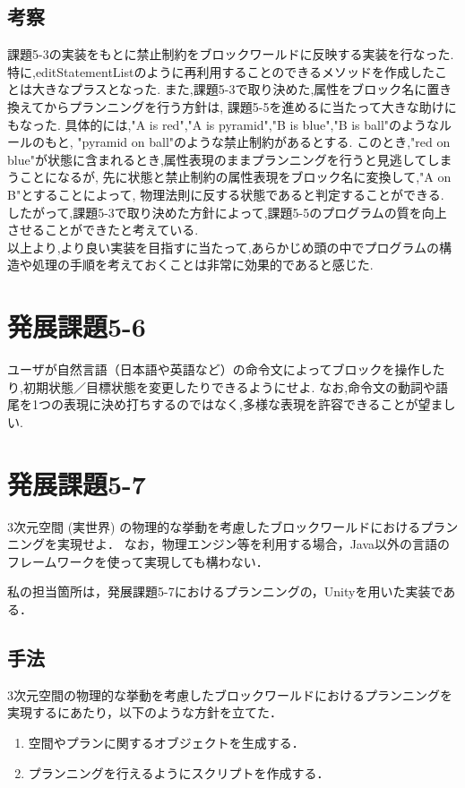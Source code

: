 \documentclass[uplatex,12pt]{jsarticle}
\begin{document}
\subsection{考察}
課題5-3の実装をもとに禁止制約をブロックワールドに反映する実装を行なった.
特に,editStatementListのように再利用することのできるメソッドを作成したことは大きなプラスとなった.
また,課題5-3で取り決めた,属性をブロック名に置き換えてからプランニングを行う方針は,
課題5-5を進めるに当たって大きな助けにもなった.
具体的には,"A is red","A is pyramid","B is blue","B is ball"のようなルールのもと,
"pyramid on ball"のような禁止制約があるとする.
このとき,"red on blue"が状態に含まれるとき,属性表現のままプランニングを行うと見逃してしまうことになるが,
先に状態と禁止制約の属性表現をブロック名に変換して,"A on B"とすることによって,
物理法則に反する状態であると判定することができる. \\
したがって,課題5-3で取り決めた方針によって,課題5-5のプログラムの質を向上させることができたと考えている. \\
以上より,より良い実装を目指すに当たって,あらかじめ頭の中でプログラムの構造や処理の手順を考えておくことは非常に効果的であると感じた.


\section{発展課題5-6}
\begin{screen}
    ユーザが自然言語（日本語や英語など）の命令文によってブロックを操作したり,初期状態／目標状態を変更したりできるようにせよ.
    なお,命令文の動詞や語尾を1つの表現に決め打ちするのではなく,多様な表現を許容できることが望ましい.
\end{screen}

\section{発展課題5-7}
\begin{screen}
    3次元空間 (実世界) の物理的な挙動を考慮したブロックワールドにおけるプランニングを実現せよ．
    なお，物理エンジン等を利用する場合，Java以外の言語のフレームワークを使って実現しても構わない．
\end{screen}
私の担当箇所は，発展課題5-7におけるプランニングの，Unityを用いた実装である．


\subsection{手法}
3次元空間の物理的な挙動を考慮したブロックワールドにおけるプランニングを実現するにあたり，以下のような方針を立てた．
\begin{enumerate}
\item 空間やプランに関するオブジェクトを生成する．
\item プランニングを行えるようにスクリプトを作成する．
\end{enumerate}
\end{document}
